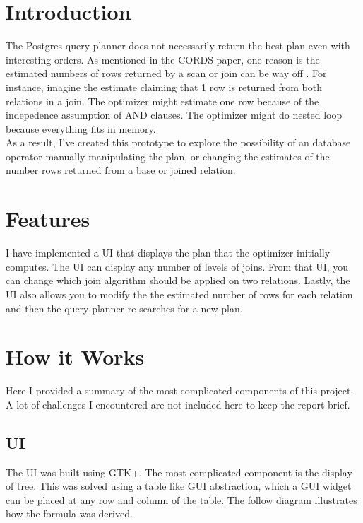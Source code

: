 \documentclass[letterpaper,10pt]{article}
\begin{document}
\raggedright

\setlength{\columnseprule}{0.5pt}


\section{Introduction}
The Postgres query planner does not necessarily return the best plan even with
interesting orders. As mentioned in the CORDS paper, one reason is the estimated
numbers of rows returned by a scan or join can be way off \cite{Ilyas04}. For
instance, imagine the estimate claiming that 1 row is returned from both
relations in a join. The optimizer might estimate one row because of the
indepedence assumption of AND clauses. The optimizer might do nested loop
because everything fits in memory. \\[0.5cm]

As a result, I've created this prototype to explore the possibility of an
database operator manually manipulating the plan, or changing the estimates of
the number rows returned from a base or joined relation.

\section{Features}
I have implemented a UI that displays the plan that the optimizer initially
computes. The UI can display any number of levels of joins. From that UI, you
can change which join algorithm should be applied on two relations. Lastly, the
UI also allows you to modify the the estimated number of rows for each relation
and then the query planner re-searches for a new plan.

\section{How it Works}
Here I provided a summary of the most complicated components of this project. A
lot of challenges I encountered are not included here to keep the report brief.

\subsection{UI}
The UI was built using GTK+. The most complicated component is the display of
tree. This was solved using a table like GUI abstraction, which a GUI widget can
be placed at any row and column of the table. The follow diagram illustrates how
the formula was derived.
\end{document}
